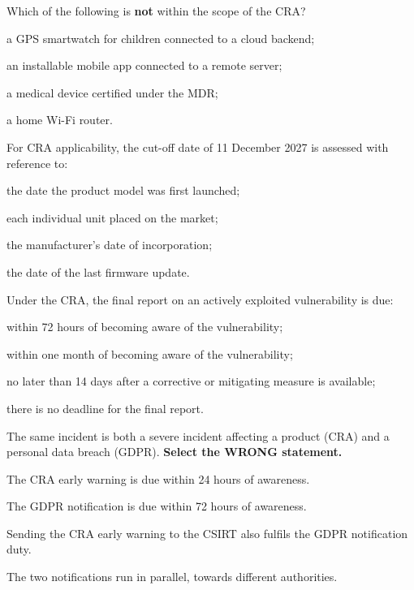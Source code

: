 \begin{domanda}\label{q:cra-ambito}
Which of the following is \textbf{not} within the scope of the CRA?
\begin{opzioni}
  \item a GPS smartwatch for children connected to a cloud backend;
  \item an installable mobile app connected to a remote server;
  \item a medical device certified under the MDR;
  \item a home Wi-Fi router.
\end{opzioni}
\end{domanda}

\begin{domanda}\label{q:cra-unita}
For CRA applicability, the cut-off date of 11 December 2027 is assessed with reference to:
\begin{opzioni}
  \item the date the product model was first launched;
  \item each individual unit placed on the market;
  \item the manufacturer's date of incorporation;
  \item the date of the last firmware update.
\end{opzioni}
\end{domanda}

\begin{domanda}\label{q:cra-final}
Under the CRA, the final report on an actively exploited vulnerability is due:
\begin{opzioni}
  \item within 72 hours of becoming aware of the vulnerability;
  \item within one month of becoming aware of the vulnerability;
  \item no later than 14 days after a corrective or mitigating measure is available;
  \item there is no deadline for the final report.
\end{opzioni}
\end{domanda}

\begin{domanda}\label{q:cra-gdpr}
The same incident is both a severe incident affecting a product (CRA) and a personal data breach
(GDPR). \textbf{Select the WRONG statement.}
\begin{opzioni}
  \item The CRA early warning is due within 24 hours of awareness.
  \item The GDPR notification is due within 72 hours of awareness.
  \item Sending the CRA early warning to the CSIRT also fulfils the GDPR notification duty.
  \item The two notifications run in parallel, towards different authorities.
\end{opzioni}
\end{domanda}

